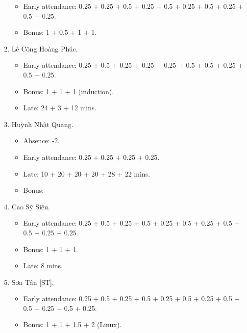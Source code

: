 \documentclass{article}
\begin{document}
\begin{enumerate}
\begin{itemize}
		\item Early attendance: 0.25 + 0.25 + 0.5 + 0.25 + 0.5 + 0.25 + 0.5 + 0.25 + 0.5 + 0.25.
		\item Bonus: 1 + 0.5 + 1 + 1.
	\end{itemize}
	\item {\sc Lê Công Hoàng Phúc.}
	\begin{itemize}
		\item Early attendance: 0.25 + 0.5 + 0.25 + 0.25 + 0.25 + 0.5 + 0.5 + 0.25 + 0.5 + 0.25.
		\item Bonus: 1 + 1 + 1 (induction). 
		\item Late: 24 + 3 + 12 mins.
	\end{itemize}
	\item {\sc Huỳnh Nhật Quang.}
	\begin{itemize}
		\item Absence: -2.
		\item Early attendance: 0.25 + 0.25 + 0.25 + 0.25.
		\item Late: 10 + 20 + 20 + 20 + 28 + 22 mins.
		\item Bonus: 
	\end{itemize}
	\item {\sc Cao Sỹ Siêu.}
	\begin{itemize}
		\item Early attendance: 0.25 + 0.5 + 0.25 + 0.5 + 0.25 + 0.5 + 0.25 + 0.5 + 0.5 + 0.25 + 0.25.
		\item Bonus: 1 + 1 + 1.
		\item Late: 8 mins.
	\end{itemize}
	\item {\sc Sơn Tân [ST].}
	\begin{itemize}
		\item Early attendance: 0.25 + 0.5 + 0.25 + 0.5 + 0.25 + 0.5 + 0.25 + 0.5 + 0.5 + 0.25 + 0.5 + 0.25.
		\item Bonus: 1 + 1 + 1.5 + 2 (Linux).
		

\end{itemize}
\end{enumerate}
\end{document}

